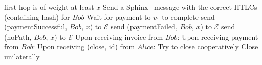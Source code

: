\begin{algorithmic}[1]
{        first hop is of weight at least $x$}
          \State Send a Sphinx~\cite{sphinx} message with the correct HTLCs (containing
          hash) for $Bob$
          \State Wait for payment to $v_1$ to complete
            \State send (paymentSuccessful, $Bob$, $x$) to $\mathcal{E}$
          \Else
            \State send (paymentFailed, $Bob$, $x$) to $\mathcal{E}$
          \EndIf
        \Else
          \State send (noPath, $Bob$, $x$) to $\mathcal{E}$
        \EndIf
      \EndIf
    \State
    \State Upon receiving invoice from $Bob$: 
    \State
    \State Upon receiving payment from $Bob$: 
    \State
    \State Upon receiving (close, id) from $Alice$:
      \State Try to close cooperatively 
       
        \State Close unilaterally 
      \EndIf
    \EndIf
  \end{algorithmic}
\hrulefill

